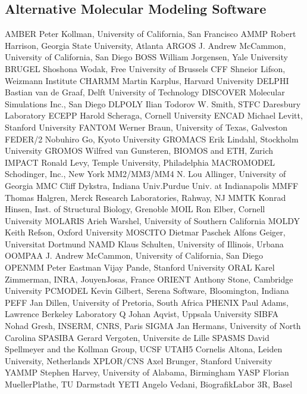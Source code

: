 \documentclass[letterpaper,11pt,english]{sphinxmanual}
\begin{document}
\subsection{Alternative Molecular Modeling Software}
\label{\detokenize{text/references:alternative-molecular-modeling-software}}
\begin{sphinxVerbatim}[commandchars=\\\{\}]
AMBER          Peter Kollman, University of California, San Francisco
AMMP           Robert Harrison, Georgia State University, Atlanta
ARGOS          J. Andrew McCammon, University of California, San Diego
BOSS           William Jorgensen, Yale University
BRUGEL         Shoshona Wodak, Free University of Brussels
CFF            Shneior Lifson, Weizmann Institute
CHARMM         Martin Karplus, Harvard University
DELPHI         Bastian van de Graaf, Delft University of Technology
DISCOVER       Molecular Simulations Inc., San Diego
DL\PYGZus{}POLY        Ilian Todorov \PYGZam{} W. Smith, STFC Daresbury Laboratory
ECEPP          Harold Scheraga, Cornell University
ENCAD          Michael Levitt, Stanford University
FANTOM         Werner Braun, University of Texas, Galveston
FEDER/2        Nobuhiro Go, Kyoto University
GROMACS        Erik Lindahl, Stockholm University
GROMOS         Wilfred van Gunsteren, BIOMOS and ETH, Zurich
IMPACT         Ronald Levy, Temple University, Philadelphia
MACROMODEL     Schodinger, Inc., New York
MM2/MM3/MM4    N. Lou Allinger, University of Georgia
MMC            Cliff Dykstra, Indiana Univ.\PYGZhy{}Purdue Univ. at Indianapolis
MMFF           Thomas Halgren, Merck Research Laboratories, Rahway, NJ
MMTK           Konrad Hinsen, Inst. of Structural Biology, Grenoble
MOIL           Ron Elber, Cornell University
MOLARIS        Arieh Warshel, University of Southern California
MOLDY          Keith Refson, Oxford University
MOSCITO        Dietmar Paschek \PYGZam{} Alfons Geiger, Universitat Dortmund
NAMD           Klaus Schulten, University of Illinois, Urbana
OOMPAA         J. Andrew McCammon, University of California, San Diego
OPENMM         Peter Eastman \PYGZam{} Vijay Pande, Stanford University
ORAL           Karel Zimmerman, INRA, Jouy\PYGZhy{}en\PYGZhy{}Josas, France
ORIENT         Anthony Stone, Cambridge University
PCMODEL        Kevin Gilbert, Serena Software, Bloomington, Indiana
PEFF           Jan Dillen, University of Pretoria, South Africa
PHENIX         Paul Adams, Lawrence Berkeley Laboratory
Q              Johan Aqvist, Uppsala University
SIBFA          Nohad Gresh, INSERM, CNRS, Paris
SIGMA          Jan Hermans, University of North Carolina
SPASIBA        Gerard Vergoten, Universite de Lille
SPASMS         David Spellmeyer and the Kollman Group, UCSF
UTAH5          Cornelis Altona, Leiden University, Netherlands
XPLOR/CNS      Axel Brunger, Stanford University
YAMMP          Stephen Harvey, University of Alabama, Birmingham
YASP           Florian Mueller\PYGZhy{}Plathe, TU Darmstadt
YETI           Angelo Vedani, Biografik\PYGZhy{}Labor 3R, Basel
\end{sphinxVerbatim}
\end{document}
